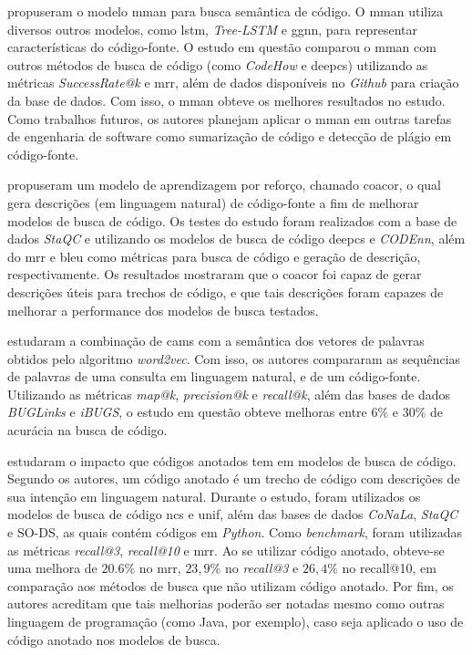 \textcite{Wan2019MultimodalAN} propuseram o modelo \gls{mman} para busca semântica de código. O \gls{mman} utiliza diversos outros modelos, como \gls{lstm}, \textit{Tree-LSTM} e \gls{ggnn}, para representar características do código-fonte. O estudo em questão comparou o \gls{mman} com outros métodos de busca de código (como \textit{CodeHow} e \gls{deepcs}) utilizando as métricas \textit{SuccessRate@k} e \gls{mrr}, além de dados disponíveis no \textit{Github} para criação da base de dados. Com isso, o \gls{mman} obteve os melhores resultados no estudo. Como trabalhos futuros, os autores planejam aplicar o \gls{mman} em outras tarefas de engenharia de software como sumarização de código e detecção de plágio em código-fonte.

\textcite{Yao2019CoaCorCA} propuseram um modelo de aprendizagem por reforço, chamado \gls{coacor}, o qual gera descrições (em linguagem natural) de código-fonte a fim de melhorar modelos de busca de código. Os testes do estudo foram realizados com a base de dados \textit{StaQC} \cite{Yao2018StaQCAS} e utilizando os modelos de busca de código \gls{deepcs} e \textit{CODEnn}, além do \gls{mrr} e \gls{bleu} como métricas para busca de código e geração de descrição, respectivamente. Os resultados mostraram que o \gls{coacor} foi capaz de gerar descrições úteis para trechos de código, e que tais descrições foram capazes de melhorar a performance dos modelos de busca testados.

\textcite{Akbar2019SCORSC} estudaram a combinação de \glspl{cam} com a semântica dos vetores de palavras obtidos pelo algoritmo \textit{word2vec}. Com isso, os autores compararam as sequências de palavras de uma consulta em linguagem natural, e de um código-fonte. Utilizando as métricas \textit{map@k}, \textit{precision@k} e \textit{recall@k}, além das bases de dados \textit{BUGLinks} e \textit{iBUGS}, o estudo em questão obteve melhoras entre $6\%$ e $30\%$ de acurácia na busca de código.

\textcite{Heyman2020NeuralCS} estudaram o impacto que códigos anotados tem em modelos de busca de código. Segundo os autores, um código anotado é um trecho de código com descrições de sua intenção em linguagem natural. Durante o estudo, foram utilizados os modelos de busca de código \gls{ncs} e \gls{unif}, além das bases de dados \textit{CoNaLa}, \textit{StaQC} \cite{Yao2018StaQCAS} e SO-DS, as quais contém códigos em \emph{Python}. Como \emph{benchmark}, foram utilizadas as métricas \textit{recall@3}, \textit{recall@10} e \gls{mrr}. Ao se utilizar código anotado, obteve-se uma melhora de $20.6\%$ no \gls{mrr}, $23,9\%$ no \textit{recall@3} e $26,4\%$ no recall@10, em comparação aos métodos de busca que não utilizam código anotado. Por fim, os autores acreditam que tais melhorias poderão ser notadas mesmo como outras linguagem de programação (como Java, por exemplo), caso seja aplicado o uso de código anotado nos modelos de busca.

